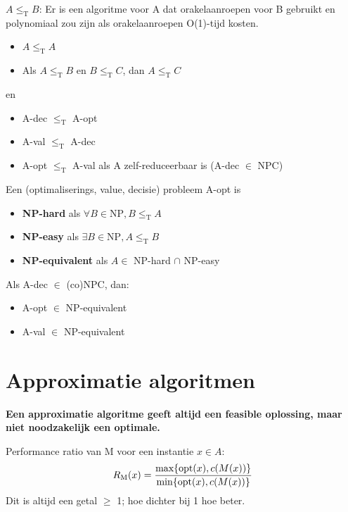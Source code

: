 \documentclass[]{article}
\begin{document}
$A \leq_\text{T} B$: Er is een algoritme voor A dat orakelaanroepen voor B gebruikt en polynomiaal zou zijn als orakelaanroepen O(1)-tijd kosten.

\begin{itemize}
\item $A \leq_\text{T} A$
\item Als $A \leq_\text{T} B$ en $B \leq_\text{T} C$, dan $A \leq_\text{T} C$
\end{itemize}

en

\begin{itemize}
\item A-dec $\leq_\text{T}$ A-opt
\item A-val $\leq_\text{T}$ A-dec
\item A-opt $\leq_\text{T}$ A-val als A zelf-reduceerbaar is (A-dec $\in$ NPC)
\end{itemize}

\bigskip

Een (optimaliserings, value, decisie) probleem A-opt is

\begin{itemize}
\item \textbf{NP-hard} als $\forall B \in \text{NP}, B \leq_\text{T} A$
\item \textbf{NP-easy} als $\exists B \in \text{NP}, A \leq_\text{T} B$
\item \textbf{NP-equivalent} als $A \in$ NP-hard $\cap$ NP-easy
\end{itemize}

\bigskip

Als A-dec $\in$ (co)NPC, dan:
\begin{itemize}
\item A-opt $\in$ NP-equivalent
\item A-val $\in$ NP-equivalent
\end{itemize}

\section*{Approximatie algoritmen}

\textbf{Een approximatie algoritme geeft altijd een feasible oplossing, maar niet noodzakelijk een optimale.}

\medskip

Performance ratio van M voor een instantie $x \in A$:
\[
R_\text{M}(x) = {{ \text{max} \{ \text{opt}(x), c(M(x)) \} } \over { \text{min} \{ \text{opt}(x), c(M(x)) \} }}
\]
Dit is altijd een getal $\geq$ 1; hoe dichter bij 1 hoe beter.
\end{document}
